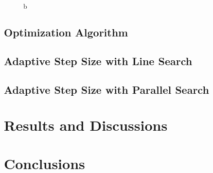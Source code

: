 \begin{figure}
\begin{minipage}{.25\textwidth}
	\caption{b}	
	\end{minipage}
	\label{fig:nucleon_naive}
\end{figure}



\subsection{Optimization Algorithm}


\subsection{Adaptive Step Size with Line Search}


\subsection{Adaptive Step Size with Parallel Search}

\section{Results and Discussions}

\section{Conclusions}
